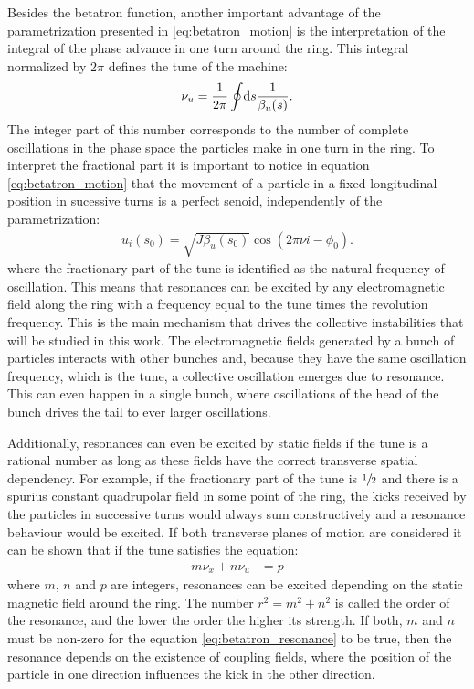 \documentclass[
	12pt,				%
	openright,			%
	oneside,			%
	a4paper,		%
	chapter=TITLE,		%
	section=TITLE,		%
    brazil,				%
	english,			%
	sumario=tradicional,
	]{abntex2}
\begin{document}
	Besides the betatron function, another important advantage of the parametrization presented in \ref{eq:betatron_motion} is the interpretation of the integral of the phase advance in one turn around the ring. This integral normalized by $2\pi$ defines the tune of the machine:
	\begin{align}
		\nu_u = \frac{1}{2\pi}\oint\!\text{d}s \frac{1}{\beta_u(s)}.
	\end{align}
	The integer part of this number corresponds to the number of complete oscillations in the phase space the particles make in one turn in the ring. To interpret the fractional part it is important to notice in equation \ref{eq:betatron_motion} that the movement of a particle in a fixed longitudinal position in sucessive turns is a perfect senoid, independently of the parametrization:
	\begin{align}
		u_i(s_0) = \sqrt{J\beta_u(s_0)}\cos(2\pi\nu i -\phi_0).
	\end{align}
	where the fractionary part of the tune is identified as the natural frequency of oscillation. This means that resonances can be excited by any electromagnetic field along the ring with a frequency equal to the tune times the revolution frequency. This is the main mechanism that drives the collective instabilities that will be studied in this work. The electromagnetic fields generated by a bunch of particles interacts with other bunches and, because they have the same oscillation frequency, which is the tune, a collective oscillation emerges due to resonance. This can even happen in a single bunch, where oscillations of the head of the bunch drives the tail to ever larger oscillations.

	Additionally, resonances can even be excited by static fields if the tune is a rational number as long as these fields have the correct transverse spatial dependency. For example, if the fractionary part of the tune is $\sfrac12$ and there is a spurius constant quadrupolar field in some point of the ring, the kicks received by the particles in successive turns would always sum constructively and a resonance behaviour would be excited. If both transverse planes of motion are considered it can be shown that if the tune satisfies the equation:
	\begin{align}\label{eq:betatron_resonance}
		m\nu_x + n\nu_u &= p
	\end{align}
	where $m$, $n$ and $p$ are integers, resonances can be excited depending on the static magnetic field around the ring. The number $r^2 = m^2 + n^2$ is called the order of the resonance, and the lower the order the higher its strength. If both, $m$ and $n$ must be non-zero for the equation \ref{eq:betatron_resonance} to be true, then the resonance depends on the existence of coupling fields, where the position of the particle in one direction influences the kick in the other direction.
\end{document}

